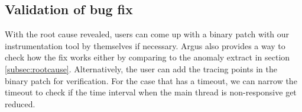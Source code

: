 %
%
\subsection{Validation of bug fix}
With the root cause revealed, users can come up with a binary patch with our instrumentation tool by themselves if necessary.
Argus also provides a way to check how the fix works either by comparing to the anomaly extract in section \ref{subsec:rootcause}. Alternatively, the user can add the tracing points in the binary patch for verification.
For the case that has a timeout, we can narrow the timeout to check if the time interval when the main thread is non-responsive get reduced.

